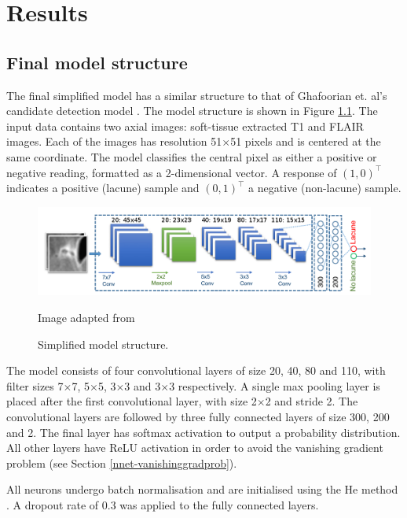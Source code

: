 


\chapter{Results}\label{results}

\section{Final model structure}

The final simplified model has a similar structure to that of Ghafoorian et. al's candidate detection model \cite{GhafoorianM.2017Dml3}. The model structure is shown in Figure \ref{results-model-fig}. The input data contains two axial images: soft-tissue extracted T1 and FLAIR images. Each of the images has resolution 51$\times$51 pixels and is centered at the same coordinate. The model classifies the central pixel as either a positive or negative reading, formatted as a 2-dimensional vector. A response of $(1,0)^\intercal$ indicates a positive (lacune) sample and $(0,1)^\intercal$ a negative (non-lacune) sample.

\begin{figure}[ht]
	\centering
	\includegraphics[width=\textwidth]{Images/7_simplified_model.png}
	\caption{Simplified model structure.}
	\small Image adapted from \cite{GhafoorianM.2017Dml3}
	\label{results-model-fig}
\end{figure}

The model consists of four convolutional layers of size 20, 40, 80 and 110, with filter sizes 7$\times$7, 5$\times$5, 3$\times$3 and 3$\times$3 respectively. A single max pooling layer is placed after the first convolutional layer, with size 2$\times$2 and stride 2. The convolutional layers are followed by three fully connected layers of size 300, 200 and 2. The final layer has softmax activation to output a probability distribution. All other layers have ReLU activation in order to avoid the vanishing gradient problem (see Section \ref{nnet-vanishinggradprob}).

All neurons undergo batch normalisation and are initialised using the He method \cite{HeKaiming2015DDiR}. A dropout rate of 0.3 was applied to the fully connected layers.

